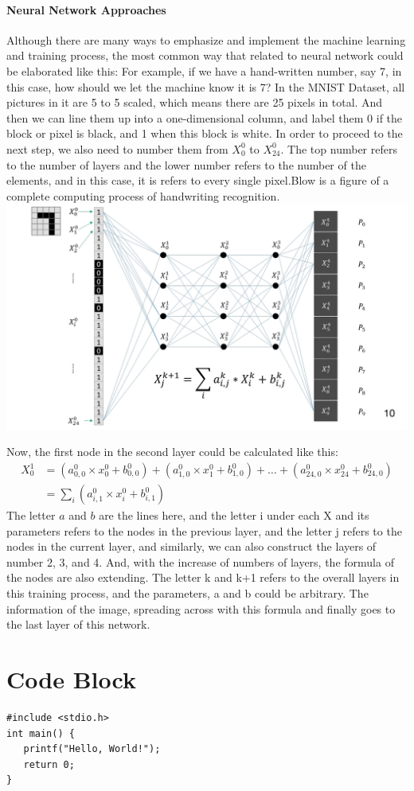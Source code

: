 \documentclass[12pt]{article}
\begin{document}
\paragraph{Neural Network Approaches}
Although there are many ways to emphasize and implement the machine learning and training process, the most common way that related to neural network could be elaborated like this: For example, if we have a hand-written number, say 7, in this case, how should we let the machine know it is 7? In the MNIST Dataset, all pictures in it are 5 to 5 scaled, which means there are 25 pixels in total. And then we can line them up into a one-dimensional column, and label them 0 if the block or pixel is black, and 1 when this block is white. In order to proceed to the next step, we also need to number them from $X^{0}_{0}$ to $X^{0}_{24}$. The top number refers to the number of layers and the lower number refers to the number of the elements, and in this case, it is refers to every single pixel.Blow is a figure of a complete computing process of handwriting recognition.
\vspace{10pt}
\includegraphics[page = 1, width=\linewidth]{Neural Networks Exemplar.pdf}

Now, the first node in the second layer could be calculated like this: 
\begin{align}
X^1_{0} &= (a^0_{0,0} \times x^0_{0} + b^0_{0,0}) + (a^0_{1,0} \times x^0_{1} + b^0_{1,0}) + \ldots + (a^0_{24,0} \times x^0_{24} + b^0_{24,0}) \\
&= \sum_{i} (a^0_{i,1} \times x^0_{i} + b^0_{i,1})
\end{align}
The letter $a$ and $b$ are the lines here, and the letter i under each X and its parameters refers to the nodes in the previous layer, and the letter j refers to the nodes in the current layer, and similarly, we can also construct the layers of number 2, 3, and 4. And, with the increase of numbers of layers, the formula of the nodes are also extending. The letter k and k+1 refers to the overall layers in this training process, and the parameters, a and b could be arbitrary. The information of the image, spreading across with this formula and finally goes to the last layer of this network. 


\section*{Code Block}
\begin{verbatim}
#include <stdio.h>
int main() {
   printf("Hello, World!");
   return 0;
}
\end{verbatim}

%
%
\end{document}
